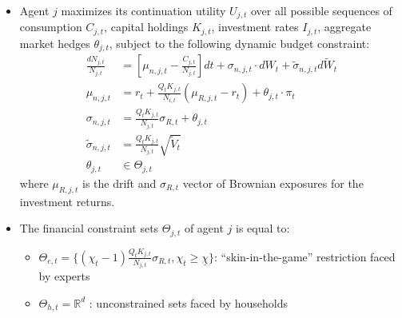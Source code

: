 \documentclass[12pt]{article}
\begin{document}
\begin{itemize}
\item Agent $j$ maximizes its continuation utility $U_{j,t}$ over all possible sequences of consumption $C_{j,t}$, capital holdings $K_{j,t}$, investment rates $I_{j,t}$, aggregate market hedges $\theta_{j,t}$,  subject to the following dynamic budget constraint:
\begin{align*}
 \frac{d N_{j,t}}{N_{j,t}} &= \left[ \mu_{n,j,t}- \frac{C_{j,t}}{N_{j,t}}\right] dt + \sigma_{n,j,t} \cdot dW_t + \widetilde{\sigma}_{n,j,t} d\widetilde{W}_t \\
 \mu_{n,j,t} &= r_t + \frac{Q_t K_{j,t}}{N_{i,t}} \left( \mu_{R,j,t} - r_t \right) + \theta_{j,t} \cdot \pi_t \\
 \sigma_{n,j,t} &= \frac{Q_t K_{j,t}}{N_{j,t}}  \sigma_{R,t} + \theta_{j,t} \\
  \widetilde{\sigma}_{n,j,t} &= \frac{Q_t K_{j,t}}{N_{j,t}} \sqrt{\widetilde{V}_t}  \\
 \theta_{j,t} &\in \Theta_{j,t}
\end{align*}
where $\mu_{R,j,t}$ is the drift and  $\sigma_{R,t}$ vector of Brownian exposures for the investment returns.  
\normalsize
\item The financial constraint sets $\Theta_{j,t}$ of agent $j$ is equal to:
\begin{itemize}
  \item $\Theta_{e,t} = \{(\chi_t-1) \frac{Q_t K_{j,t}}{N_{j,t}}  \sigma_{R,t} , \chi_t \geq \underline{\chi} \}$: ``skin-in-the-game'' restriction faced by experts
  \item $\Theta_{h,t} = \mathbb{R}^d$ : unconstrained sets faced by households
\end{itemize}
\end{itemize}
\end{document}
